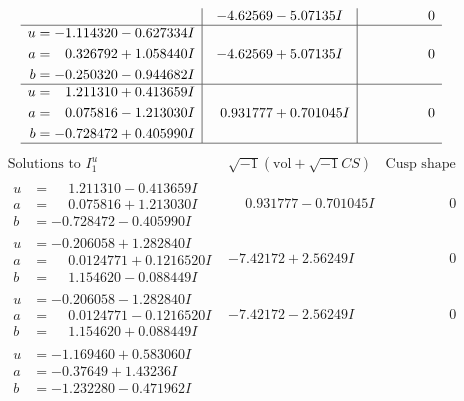 \documentclass[1p]{elsarticle_modified}
\theoremstyle{definition}
\newcommand{\I}{\sqrt{-1}}
\begin{document}
$$\begin{array}{c|c|c}
 & -4.62569 - 5.07135 I & \phantom{-0.000000 } 0 \\ \hline\begin{aligned}
u &= -1.114320 - 0.627334 I \\
a &= \phantom{-}0.326792 + 1.058440 I \\
b &= -0.250320 - 0.944682 I\end{aligned}
 & -4.62569 + 5.07135 I & \phantom{-0.000000 } 0 \\ \hline\begin{aligned}
u &= \phantom{-}1.211310 + 0.413659 I \\
a &= \phantom{-}0.075816 - 1.213030 I \\
b &= -0.728472 + 0.405990 I\end{aligned}
 & \phantom{-}0.931777 + 0.701045 I & \phantom{-0.000000 } 0\\
 \hline 
 \end{array}$$\newpage$$\begin{array}{c|c|c}  
\text{Solutions to }I^u_{1}& \I (\text{vol} + \sqrt{-1}CS) & \text{Cusp shape}\\
 \hline 
\begin{aligned}
u &= \phantom{-}1.211310 - 0.413659 I \\
a &= \phantom{-}0.075816 + 1.213030 I \\
b &= -0.728472 - 0.405990 I\end{aligned}
 & \phantom{-}0.931777 - 0.701045 I & \phantom{-0.000000 } 0 \\ \hline\begin{aligned}
u &= -0.206058 + 1.282840 I \\
a &= \phantom{-}0.0124771 + 0.1216520 I \\
b &= \phantom{-}1.154620 - 0.088449 I\end{aligned}
 & -7.42172 + 2.56249 I & \phantom{-0.000000 } 0 \\ \hline\begin{aligned}
u &= -0.206058 - 1.282840 I \\
a &= \phantom{-}0.0124771 - 0.1216520 I \\
b &= \phantom{-}1.154620 + 0.088449 I\end{aligned}
 & -7.42172 - 2.56249 I & \phantom{-0.000000 } 0 \\ \hline\begin{aligned}
u &= -1.169460 + 0.583060 I \\
a &= -0.37649 + 1.43236 I \\
b &= -1.232280 - 0.471962 I\end{aligned}

\end{array}$$
\end{document}
